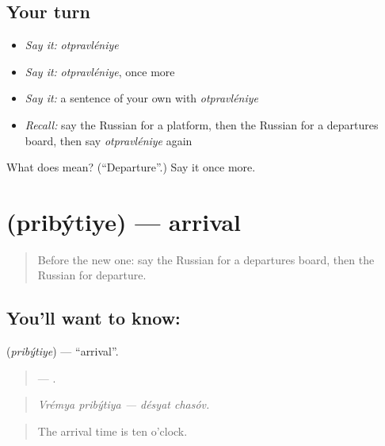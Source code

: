 \subsection*{Your turn}
\begin{itemize}
\raggedright
  \item \emph{Say it:} \emph{otpravléniye}
  \item \emph{Say it:} \emph{otpravléniye}, once more
  \item \emph{Say it:} a sentence of your own with \emph{otpravléniye}
  \item \emph{Recall:} say the Russian for a platform, then the Russian for a departures board, then say \emph{otpravléniye} again
\end{itemize}

\begin{tcolorbox}[breakable,colback=teal!4,colframe=teal!35!black,title={Before you move on}]
What does  mean? (\textquotedblleft{}Departure\textquotedblright{}.) Say it once more.
\end{tcolorbox}
\section[\texorpdfstring{\ru{прибытие} (pribýtiye)}{прибытие (pribýtiye)}]{ (pribýtiye) — arrival}

\label{lesson:RU-C414-pribytiye}



\begin{quote}
Before the new one: say the Russian for a departures board, then the Russian for departure.
\end{quote}

\subsection*{You'll want to know: }
\textbf{} (\emph{pribýtiye}) — \textquotedblleft{}arrival\textquotedblright{}.

\begin{quote}
  —  .
\end{quote}

\begin{quote}
\emph{Vrémya pribýtiya — désyat chasóv.}
\end{quote}

\begin{quote}
The arrival time is ten o'clock.
\end{quote}

